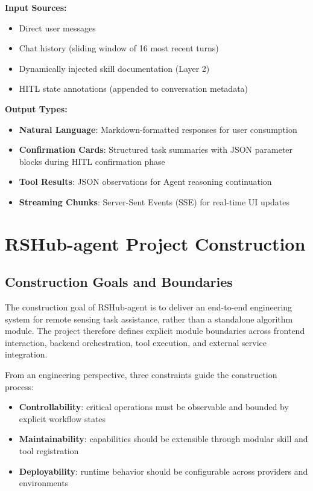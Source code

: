\textbf{Input Sources:}
\begin{itemize}
	\item Direct user messages
	\item Chat history (sliding window of 16 most recent turns)
	\item Dynamically injected skill documentation (Layer 2)
	\item HITL state annotations (appended to conversation metadata)
\end{itemize}

\textbf{Output Types:}
\begin{itemize}
	\item \textbf{Natural Language}: Markdown-formatted responses for user consumption
	\item \textbf{Confirmation Cards}: Structured task summaries with JSON parameter blocks during HITL confirmation phase
	\item \textbf{Tool Results}: JSON observations for Agent reasoning continuation
	\item \textbf{Streaming Chunks}: Server-Sent Events (SSE) for real-time UI updates
\end{itemize}

\section{RSHub-agent Project Construction}
\label{sec:construction}

\subsection{Construction Goals and Boundaries}
The construction goal of RSHub-agent is to deliver an end-to-end engineering system for remote sensing task assistance, rather than a standalone algorithm module. The project therefore defines explicit module boundaries across frontend interaction, backend orchestration, tool execution, and external service integration.

From an engineering perspective, three constraints guide the construction process:
\begin{itemize}
	\item \textbf{Controllability}: critical operations must be observable and bounded by explicit workflow states
	\item \textbf{Maintainability}: capabilities should be extensible through modular skill and tool registration
	\item \textbf{Deployability}: runtime behavior should be configurable across providers and environments
\end{itemize}

